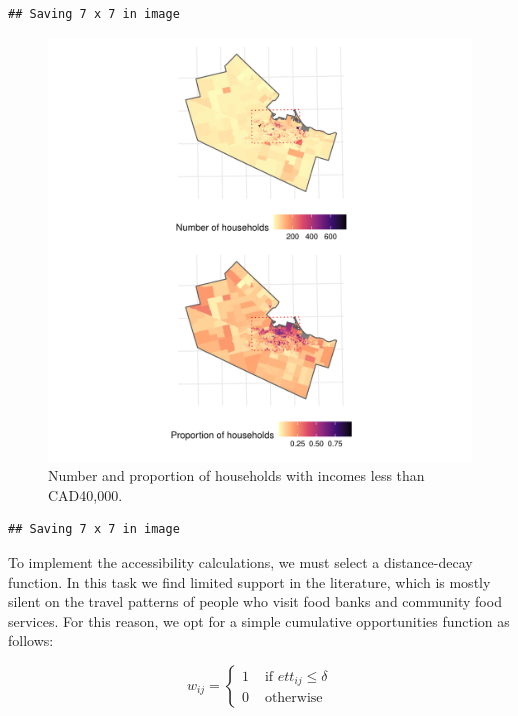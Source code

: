 \documentclass[]{elsarticle} %
\begin{document}
\begin{verbatim}
## Saving 7 x 7 in image
\end{verbatim}

\begin{figure}
\includegraphics[width=1\linewidth]{Accessibility-Foodbanks-Hamilton_files/figure-latex/plot-low-income-households-1} \caption{\label{fig:low-income-households}Number and proportion of households with incomes less than CAD40,000.}\label{fig:plot-low-income-households}
\end{figure}

\begin{verbatim}
## Saving 7 x 7 in image
\end{verbatim}

To implement the accessibility calculations, we must select a
distance-decay function. In this task we find limited support in the
literature, which is mostly silent on the travel patterns of people who
visit food banks and community food services. For this reason, we opt
for a simple cumulative opportunities function as follows:

\[
w_{ij}=
\begin{cases}
1 & \text{ if } ett_{ij}\le \delta\\
0 & \text{ otherwise}
\end{cases}
\]
\end{document}
